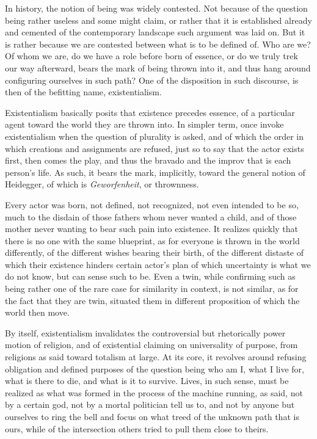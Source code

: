 In history, the notion of being was widely contested. Not because of the question being rather useless and some might claim, or rather that it is established already and cemented of the contemporary landscape such argument was laid on. But it is rather because we are contested between what is to be defined of. Who are we? Of whom we are, do we have a role before born of essence, or do we truly trek our way afterward, bears the mark of being thrown into it, and thus hang around configuring ourselves in such path? One of the disposition in such discourse, is then of the befitting name, existentialism.

Existentialism basically posits that existence precedes essence, of a particular agent toward the world they are thrown into. In simpler term, once invoke existentialism when the question of plurality is asked, and of which the order in which creations and assignments are refused, just so to say that the actor exists first, then comes the play, and thus the bravado and the improv that is each person's life. As such, it bears the mark, implicitly, toward the general notion of Heidegger, of which is \textit{Geworfenheit}, or thrownness.

Every actor was born, not defined, not recognized, not even intended to be so, much to the disdain of those fathers whom never wanted a child, and of those mother never wanting to bear such pain into existence. It realizes quickly that there is no one with the same blueprint, as for everyone is thrown in the world differently, of the different wishes bearing their birth, of the different distaste of which their existence hinders certain actor's plan of which uncertainty is what we do not know, but can sense such to be. Even a twin, while confirming such as being rather one of the rare case for similarity in context, is not similar, as for the fact that they are twin, situated them in different proposition of which the world then move.

By itself, existentialism invalidates the controversial but rhetorically power motion of religion, and of existential claiming on universality of purpose, from religions as said toward totalism at large. At its core, it revolves around refusing obligation and defined purposes of the question being who am I, what I live for, what is there to die, and what is it to survive. Lives, in such sense, must be realized as what was formed in the process of the machine running, as said, not by a certain god, not by a mortal politician tell us to, and not by anyone but ourselves to ring the bell and focus on what treed of the unknown path that is ours, while of the intersection others tried to pull them close to theirs.

